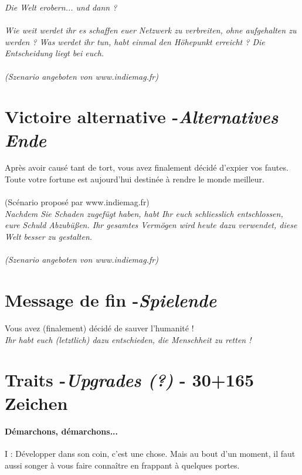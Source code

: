 \documentclass[10pt,a4paper]{article}
\begin{document}
\textit{Die Welt erobern... und dann ?\\ \\ Wie weit werdet ihr es schaffen euer Netzwerk zu verbreiten, ohne aufgehalten zu werden ? Was werdet ihr tun, habt einmal den Höhepunkt erreicht ? Die Entscheidung liegt bei euch.\\ \\ (Szenario angeboten von www.indiemag.fr)}


\section{Victoire alternative -\emph{Alternatives Ende}}

Après avoir causé tant de tort, vous avez finalement décidé d'expier vos fautes. Toute votre fortune est aujourd'hui destinée à rendre le monde meilleur. \\ \\ (Scénario proposé par www.indiemag.fr)\\

\textit{Nachdem Sie Schaden zugefügt haben, habt Ihr euch schliesslich entschlossen, eure Schuld Abzubü\ss en. Ihr gesamtes Vermögen wird heute dazu verwendet, diese Welt besser zu gestalten. \\ \\ (Szenario angeboten von www.indiemag.fr)}


\section{Message de fin -\emph{Spielende}}

Vous avez (finalement) décidé de sauver l'humanité !\\

\textit{Ihr habt euch (letztlich) dazu entschieden, die Menschheit zu retten !}


\section{Traits -\emph{Upgrades (?)} - 30+165 Zeichen}

\paragraph{Démarchons, démarchons...} I : Développer dans son coin, c'est une chose. Mais au bout d'un moment, il faut aussi songer à vous faire connaître en frappant à quelques portes.\\
\end{document}
